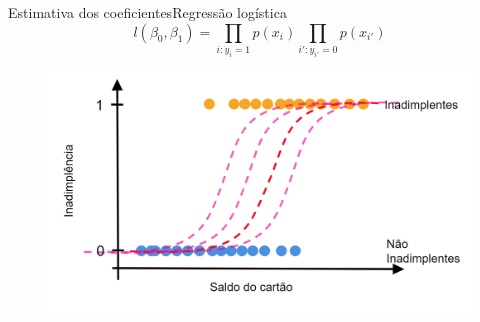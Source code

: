 \documentclass[t]{beamer}
\begin{document}
\begin{ftst}{Estimativa dos coeficientes}{Regressão logística}
\begin{equation}
    l(\beta_0, \beta_1) = \prod_{i:y_i=1} p(x_i) \prod_{i':y_{i'}=0} p(x_{i'})
\end{equation}

\begin{figure}
    \centering
    \includegraphics[scale=0.15]{Figuras/slide05_08.png}
\end{figure}


\end{ftst}
\end{document}
